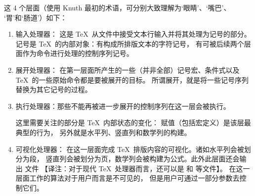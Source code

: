 \documentclass{book}
\begin{document}
这 4 个层面（使用 Knuth 最初的术语，可分别大致理解为‘眼睛’、‘嘴巴’、
‘胃’和‘肠道’）如下：
\begin{enumerate}
\item 输入处理器：
这是 \TeX\ 从文件中接受文本行输入并将其处理为记号的部分。
记号是 \TeX\ 的内部对象：有构成所排版文本的字符记号，
有可被后续两个层面作为命令进行处理的控制序列记号。
\item 展开处理器：
在第一层面所产生的一些（并非全部）记号\ldash 宏、条件式以及
\TeX\ 的一些原始命令\rdash 都是要被展开的目标。
所谓展开，就是将一些记号序列替换为其它记号的过程。
\item 执行处理器：那些不能再被进一步展开的控制序列在这一层会被执行。

这里需要关注的部分是 \TeX\ 内部状态的变化：
赋值（包括宏定义）是该层最典型的行为，
另外就是水平列、竖直列和数学列的构建。
\item 可视化处理器：
在这一层面完成 \TeX\ 排版内容的可视化。诸如水平列会被划分为段，
竖直列会被划分为页，数学列会被构建为公式。此外此层面还会输出  文件%
【译注：对于现代 \TeX\ 处理器而言，还可以是  和  等文件】。
在这一层面工作的算法对于用户而言是不可见的，
但是用户可通过一部分参数去控制它们。
\end{enumerate}
\end{document}
